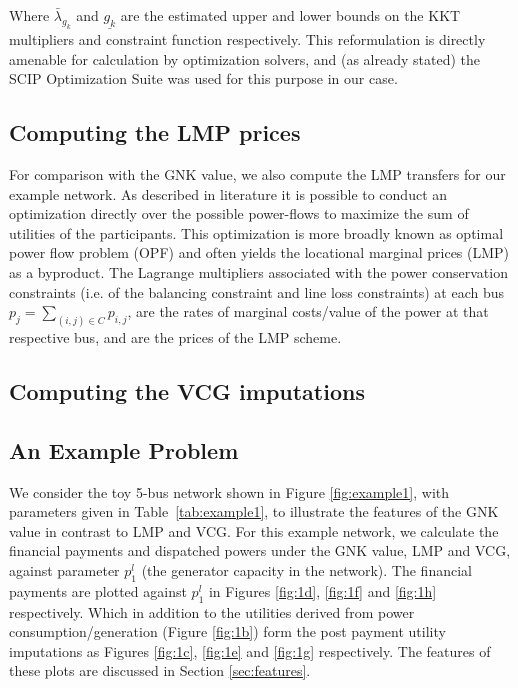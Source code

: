 Where $\bar{\lambda}_{g_k}$ and $\underline{g_k}$ are the estimated upper and lower bounds on the KKT multipliers and constraint function respectively.
This reformulation is directly amenable for calculation by optimization solvers, and (as already stated) the SCIP Optimization Suite \cite{MaherFischerGallyetal.2017} 
was used for this purpose in our case.


\subsection{Computing the LMP prices}

For comparison with the GNK value, we also compute the LMP transfers for our example network.
As described in literature \cite{lmp1,lmp2} it is possible to conduct an optimization directly over the possible power-flows to maximize the sum of utilities of the participants.
This optimization is more broadly known as optimal power flow problem (OPF) and often yields the locational marginal prices (LMP) as a byproduct.
The Lagrange multipliers associated with the power conservation constraints (i.e. of the balancing constraint and line loss constraints) at each bus $p_j = \sum_{(i,j)\in C}p_{i,j}$, are the rates of marginal costs/value of the power at that respective bus, and are the prices of the LMP scheme.



\subsection{Computing the VCG imputations}



\subsection{An Example Problem}\label{sec:example_network}

We consider the toy 5-bus network shown in Figure \ref{fig:example1}, with parameters given in Table~\ref{tab:example1}, to illustrate the features of the GNK value in contrast to LMP and VCG.
For this example network, we calculate the financial payments and dispatched powers under the GNK value, LMP and VCG, against parameter $p_1^l$ (the generator capacity in the network).
The financial payments are plotted against $p_1^l$ in Figures \ref{fig:1d}, \ref{fig:1f} and \ref{fig:1h} respectively. Which in addition to the utilities derived from power consumption/generation (Figure \ref{fig:1b}) form the post payment utility imputations as Figures \ref{fig:1c}, \ref{fig:1e} and \ref{fig:1g} respectively. The features of these plots are discussed in Section \ref{sec:features}.


